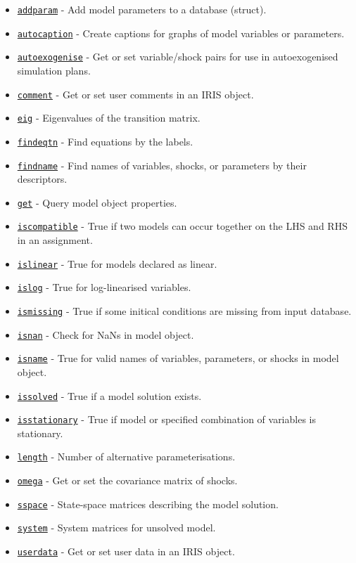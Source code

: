  \begin{itemize}
 \item
   \href{model/addparam}{\texttt{addparam}} - Add model parameters to a
   database (struct).
 \item
   \href{model/autocaption}{\texttt{autocaption}} - Create captions for
   graphs of model variables or parameters.
 \item
   \href{model/autoexogenise}{\texttt{autoexogenise}} - Get or set
   variable/shock pairs for use in autoexogenised simulation plans.
 \item
   \href{model/comment}{\texttt{comment}} - Get or set user comments in
   an IRIS object.
 \item
   \href{model/eig}{\texttt{eig}} - Eigenvalues of the transition matrix.
 \item
   \href{model/findeqtn}{\texttt{findeqtn}} - Find equations by the
   labels.
 \item
   \href{model/findname}{\texttt{findname}} - Find names of variables,
   shocks, or parameters by their descriptors.
 \item
   \href{model/get}{\texttt{get}} - Query model object properties.
 \item
   \href{model/iscompatible}{\texttt{iscompatible}} - True if two models
   can occur together on the LHS and RHS in an assignment.
 \item
   \href{model/islinear}{\texttt{islinear}} - True for models declared as
   linear.
 \item
   \href{model/islog}{\texttt{islog}} - True for log-linearised
   variables.
 \item
   \href{model/ismissing}{\texttt{ismissing}} - True if some initical
   conditions are missing from input database.
 \item
   \href{model/isnan}{\texttt{isnan}} - Check for NaNs in model object.
 \item
   \href{model/isname}{\texttt{isname}} - True for valid names of
   variables, parameters, or shocks in model object.
 \item
   \href{model/issolved}{\texttt{issolved}} - True if a model solution
   exists.
 \item
   \href{model/isstationary}{\texttt{isstationary}} - True if model or
   specified combination of variables is stationary.
 \item
   \href{model/length}{\texttt{length}} - Number of alternative
   parameterisations.
 \item
   \href{model/omega}{\texttt{omega}} - Get or set the covariance matrix
   of shocks.
 \item
   \href{model/sspace}{\texttt{sspace}} - State-space matrices describing
   the model solution.
 \item
   \href{model/system}{\texttt{system}} - System matrices for unsolved
   model.
 \item
   \href{model/userdata}{\texttt{userdata}} - Get or set user data in an
   IRIS object.
 \end{itemize}
 
